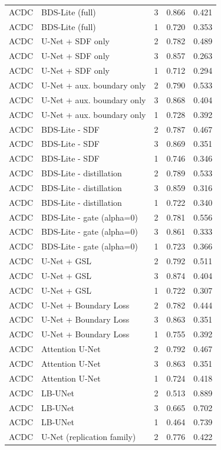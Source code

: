 \begin{tabular}{lllll}
ACDC & BDS-Lite (full) & 3 & 0.866 & 0.421 \\
ACDC & BDS-Lite (full) & 1 & 0.720 & 0.353 \\
ACDC & U-Net + SDF only & 2 & 0.782 & 0.489 \\
ACDC & U-Net + SDF only & 3 & 0.857 & 0.263 \\
ACDC & U-Net + SDF only & 1 & 0.712 & 0.294 \\
ACDC & U-Net + aux. boundary only & 2 & 0.790 & 0.533 \\
ACDC & U-Net + aux. boundary only & 3 & 0.868 & 0.404 \\
ACDC & U-Net + aux. boundary only & 1 & 0.728 & 0.392 \\
ACDC & BDS-Lite - SDF & 2 & 0.787 & 0.467 \\
ACDC & BDS-Lite - SDF & 3 & 0.869 & 0.351 \\
ACDC & BDS-Lite - SDF & 1 & 0.746 & 0.346 \\
ACDC & BDS-Lite - distillation & 2 & 0.789 & 0.533 \\
ACDC & BDS-Lite - distillation & 3 & 0.859 & 0.316 \\
ACDC & BDS-Lite - distillation & 1 & 0.722 & 0.340 \\
ACDC & BDS-Lite - gate (alpha=0) & 2 & 0.781 & 0.556 \\
ACDC & BDS-Lite - gate (alpha=0) & 3 & 0.861 & 0.333 \\
ACDC & BDS-Lite - gate (alpha=0) & 1 & 0.723 & 0.366 \\
ACDC & U-Net + GSL & 2 & 0.792 & 0.511 \\
ACDC & U-Net + GSL & 3 & 0.874 & 0.404 \\
ACDC & U-Net + GSL & 1 & 0.722 & 0.307 \\
ACDC & U-Net + Boundary Loss & 2 & 0.782 & 0.444 \\
ACDC & U-Net + Boundary Loss & 3 & 0.863 & 0.351 \\
ACDC & U-Net + Boundary Loss & 1 & 0.755 & 0.392 \\
ACDC & Attention U-Net & 2 & 0.792 & 0.467 \\
ACDC & Attention U-Net & 3 & 0.863 & 0.351 \\
ACDC & Attention U-Net & 1 & 0.724 & 0.418 \\
ACDC & LB-UNet & 2 & 0.513 & 0.889 \\
ACDC & LB-UNet & 3 & 0.665 & 0.702 \\
ACDC & LB-UNet & 1 & 0.464 & 0.739 \\
ACDC & U-Net (replication family) & 2 & 0.776 & 0.422 \\

\end{tabular}
